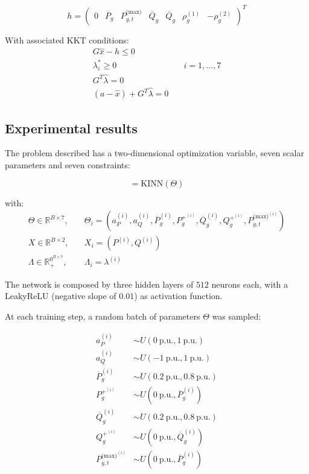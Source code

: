 \documentclass[
]{article}
\begin{document}
\begin{equation}
h = \begin{pmatrix}
0 & \overline{P}_g & P^{\textrm{(max)}}_{g,t} & \overline{Q}_g & \overline{Q}_g & \rho^{(1)}_g & -\rho^{(2)}_g
\end{pmatrix}^T
\end{equation}

With associated KKT conditions: \begin{align}
    G\hat{x} - h \leq 0&\\
    \lambda_i^* \geq 0& \quad i=1,\dots, 7\\
    G^T\hat\lambda = 0&\\
    (a-\hat{x}) + G^T\hat\lambda  = 0 &
\end{align}

\subsection{Experimental results}\label{experimental-results}

The problem described has a two-dimensional optimization variable, seven
scalar parameters and seven constraints:

\begin{equation}
 [X, \Lambda] = \mathrm{KINN}(\Theta)
\end{equation}

with: \begin{align}
\Theta \in \mathbb{R}^{B \times 7}, \quad&\Theta_{i} = (a_P^{(i)}, a_Q^{(i)},\overline{P}_g^{(i)},  P_g^{+^{(i)}}, \overline{Q}_g^{(i)},  Q_g^{+^{(i)}}, P^{\textrm{(max)}^{(i)}}_{g,t})\\
X \in \mathbb{R}^{B \times 2}, \quad&X_{i} = (P^{(i)}, Q^{(i)})\\
\Lambda \in \mathbb{R}_+^{0^{B \times 7}}, \quad&\Lambda_{i} = \lambda^{(i)}
\end{align}

The network is composed by three hidden layers of \(512\) neurons each,
with a LeakyReLU (negative slope of \(0.01\)) as activation function.

At each training step, a random batch of parameters \(\Theta\) was
sampled:

\begin{align}
a_P^{(i)} &\sim U(0~\mathrm{p.u}., 1~\mathrm{p.u.})\\
a_Q^{(i)} &\sim U(-1~\mathrm{p.u}., 1~\mathrm{p.u.})\\
\overline{P}_g^{(i)} &\sim U(0.2~\mathrm{p.u}., 0.8~\mathrm{p.u.})\\
P_g^{+^{(i)}} &\sim U(0~\mathrm{p.u}., \overline{P}_g^{(i)})\\
\overline{Q}_g^{(i)} &\sim U(0.2~\mathrm{p.u}., 0.8~\mathrm{p.u.})\\
Q_g^{+^{(i)}} &\sim U(0~\mathrm{p.u}., \overline{Q}_g^{(i)})\\
P^{\textrm{(max)}^{(i)}}_{g,t} &\sim U(0~\mathrm{p.u}., \overline{P}_g^{(i)})
\end{align}
\end{document}
